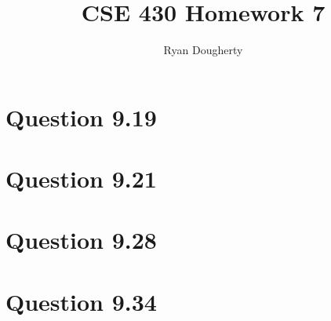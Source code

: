 \documentclass[12pt]{article}
\title{CSE 430 Homework 7}
\author{Ryan Dougherty}
\date{}                                           %
\begin{document}
\maketitle

\section*{Question 9.19}

\section*{Question 9.21}

\section*{Question 9.28}

\section*{Question 9.34}
\end{document}
